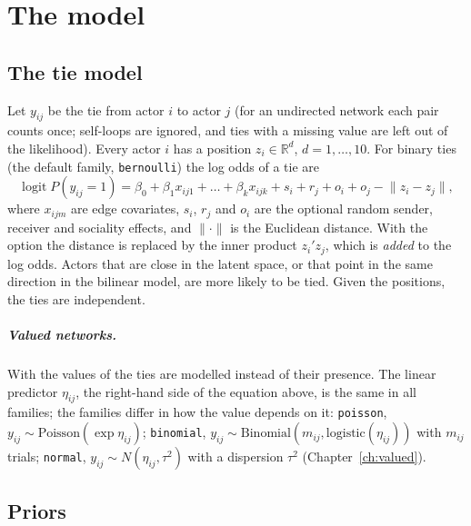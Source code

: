 \chapter{The model}\label{ch:model}

\section{The tie model}\label{sec:tiemodel}

Let $y_{ij}$ be the tie from actor $i$ to actor $j$ (for an undirected network each pair counts once; self-loops are ignored, and ties with a missing value are left out of the likelihood). Every actor $i$ has a position $z_i\in\mathbb{R}^d$, $d=1,\dots,10$. For binary ties (the default family, \texttt{bernoulli}) the log odds of a tie are
\begin{equation}
\operatorname{logit} P(y_{ij}=1)=\beta_0+\beta_1x_{ij1}+\dots+\beta_kx_{ijk}+s_i+r_j+o_i+o_j-\lVert z_i-z_j\rVert ,
\end{equation}
where $x_{ijm}$ are edge covariates, $s_i$, $r_j$ and $o_i$ are the optional random sender, receiver and sociality effects, and $\lVert\cdot\rVert$ is the Euclidean distance. With the option  the distance is replaced by the inner product $z_i'z_j$, which is \emph{added} to the log odds. Actors that are close in the latent space, or that point in the same direction in the bilinear model, are more likely to be tied. Given the positions, the ties are independent.

\paragraph{Valued networks.} With  the values of the ties are modelled instead of their presence. The linear predictor $\eta_{ij}$, the right-hand side of the equation above, is the same in all families; the families differ in how the value depends on it: \texttt{poisson}, $y_{ij}\sim\text{Poisson}(\exp\eta_{ij})$; \texttt{binomial}, $y_{ij}\sim\text{Binomial}(m_{ij},\text{logistic}(\eta_{ij}))$ with $m_{ij}$ trials; \texttt{normal}, $y_{ij}\sim N(\eta_{ij},\tau^2)$ with a dispersion $\tau^2$ (Chapter~\ref{ch:valued}).

\section{Priors}

